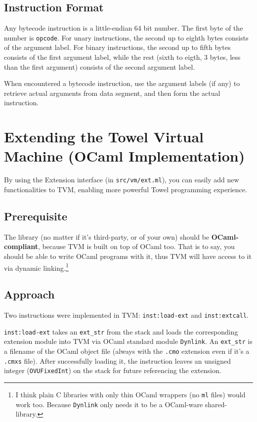 \documentclass{article}
\newcommand{\inst}[1] {\texttt{inst:#1}}
\begin{document}
\subsection{Instruction Format}

Any bytecode instruction is a little-endian 64 bit number. The first byte of the number is \texttt{opcode}. For unary instructions, the second up to eighth bytes consists of the argument label. For binary instructions, the second up to fifth bytes consists of the first argument label, while the rest (sixth to eigth, 3 bytes, less than the first argument) consists of the second argument label.

When encountered a bytecode instruction, use the argument labels (if any) to retrieve actual arguments from data segment, and then form the actual instruction.

\section{Extending the Towel Virtual Machine (OCaml Implementation)}

By using the Extension interface (in \texttt{src/vm/ext.ml}), you can easily add new functionalities to TVM, enabling more powerful Towel programming experience.

\subsection{Prerequisite}

The library (no matter if it's third-party, or of your own) should be \textbf{OCaml-compliant}, because TVM is built on top of OCaml too. That is to say, you should be able to write OCaml programs with it, thus TVM will have access to it via dynamic linking.\footnote{I think plain C libraries with only thin OCaml wrappers (no \texttt{ml} files) would work too. Because \texttt{Dynlink} only needs it to be a OCaml-ware shared-library.}

\subsection{Approach}

Two instructions were implemented in TVM: \inst{load-ext} and \inst{extcall}.

\inst{load-ext} takes an \texttt{ext\_str} from the stack and loads the corresponding extension module into TVM via OCaml standard module \texttt{Dynlink}. An \texttt{ext\_str} is a filename of the OCaml object file (always with the \texttt{.cmo} extension even if it's a \texttt{.cmxs} file). After successfully loading it, the instruction leaves an unsigned integer (\texttt{OVUFixedInt}) on the stack for future referencing the extension.
\end{document}
